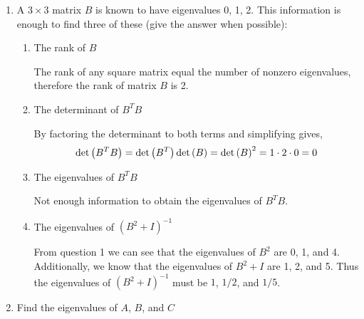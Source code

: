 \begin{enumerate}[label=\arabic*.]
    \item  A $3 \times 3$ matrix $B$ is known to have eigenvalues 0, 1,
        2. This information is enough to find three of these (give the
        answer when possible):
        \begin{enumerate}[label=(\alph*)]
            \item The rank of $B$
                \begin{mdframed}[style=MyFrame]
                    The rank of any square matrix equal the number of
                    nonzero eigenvalues, therefore the rank of
                    matrix $B$ is 2.
                \end{mdframed}
            \item The determinant of $B^{T}B$
                \begin{mdframed}[style=MyFrame]
                    By factoring the determinant to both terms and
                    simplifying gives, 
                    \begin{equation}
                        \text{det}\left(B^{T}B\right)
                        = 
                        \text{det}\left(B^{T}\right)
                        \text{det}\left(B\right)
                        = 
                        \text{det}\left(B\right)^{2}
                        =
                        1 \cdot 2 \cdot 0
                        = 0
                    \end{equation}
                \end{mdframed}
            \item The eigenvalues of $B^{T}B$
                \begin{mdframed}[style=MyFrame]
                    Not enough information to obtain the eigenvalues
                    of $B^{T}B$.
                \end{mdframed}
            \item The eigenvalues of $(B^{2}+I)^{-1}$
                \begin{mdframed}[style=MyFrame]
                    From question 1 we can see that the eigenvalues
                    of $B^{2}$ are 0, 1, and 4. Additionally, we know
                    that the eigenvalues of $B^{2}+I$ are 1, 2, and
                    5. Thus the eigenvalues of $\left(B^{2} + I
                    \right)^{-1}$ must be $1$, $1/2$, and $1/5$. 
                \end{mdframed}
        \end{enumerate}
    \item Find the eigenvalues of $A$, $B$, and $C$

\end{enumerate}
